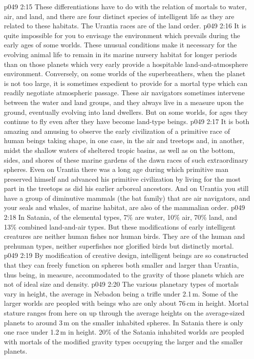 \vs p049 2:15 \bibnobreakspace {} These differentiations have to do with the relation of mortals to water, air, and land, and there are four distinct species of intelligent life as they are related to these habitats. The Urantia races are of the land order.
\vs p049 2:16 It is quite impossible for you to envisage the environment which prevails during the early ages of some worlds. These unusual conditions make it necessary for the evolving animal life to remain in its marine nursery habitat for longer periods than on those planets which very early provide a hospitable land\hyp{}and\hyp{}atmosphere environment. Conversely, on some worlds of the superbreathers, when the planet is not too large, it is sometimes expedient to provide for a mortal type which can readily negotiate atmospheric passage. These air navigators sometimes intervene between the water and land groups, and they always live in a measure upon the ground, eventually evolving into land dwellers. But on some worlds, for ages they continue to fly even after they have become land\hyp{}type beings.
\vs p049 2:17 It is both amazing and amusing to observe the early civilization of a primitive race of human beings taking shape, in one case, in the air and treetops and, in another, midst the shallow waters of sheltered tropic basins, as well as on the bottom, sides, and shores of these marine gardens of the dawn races of such extraordinary spheres. Even on Urantia there was a long age during which primitive man preserved himself and advanced his primitive civilization by living for the most part in the treetops as did his earlier arboreal ancestors. And on Urantia you still have a group of diminutive mammals (the bat family) that are air navigators, and your seals and whales, of marine habitat, are also of the mammalian order.
\vs p049 2:18 In Satania, of the elemental types, 7\% are water, 10\% air, 70\% land, and 13\% combined land\hyp{}and\hyp{}air types. But these modifications of early intelligent creatures are neither human fishes nor human birds. They are of the human and prehuman types, neither superfishes nor glorified birds but distinctly mortal.
\vs p049 2:19 \bibnobreakspace {} By modification of creative design, intelligent beings are so constructed that they can freely function on spheres both smaller and larger than Urantia, thus being, in measure, accommodated to the gravity of those planets which are not of ideal size and density.
\vs p049 2:20 The various planetary types of mortals vary in height, the average in Nebadon being a trifle under 2.1\,m. Some of the larger worlds are peopled with beings who are only about 76\,cm in height. Mortal stature ranges from here on up through the average heights on the average\hyp{}sized planets to around 3\,m on the smaller inhabited spheres. In Satania there is only one race under 1.2\,m in height. 20\% of the Satania inhabited worlds are peopled with mortals of the modified gravity types occupying the larger and the smaller planets.
